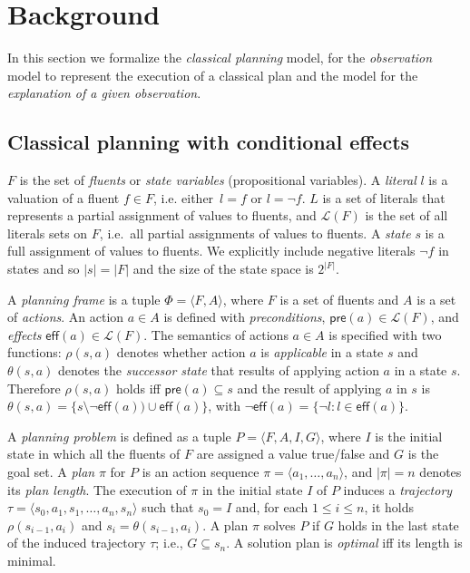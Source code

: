 \documentclass[runningheads]{llncs}
\newcommand{\tup}[1]{{\langle #1 \rangle}}
\newcommand{\pre}{\mathsf{pre}}     %
\newcommand{\eff}{\mathsf{eff}}     %
\begin{document}
\section{Background}

In this section we formalize the {\em classical planning} model, for the {\em observation} model to represent the execution of a classical plan and the model for the \emph{explanation of a given observation}.

\subsection{Classical planning with conditional effects}
$F$ is the set of {\em fluents} or {\em state variables} (propositional variables). A {\em literal} $l$ is a valuation of a fluent $f\in F$, i.e. either~$l=f$ or $l=\neg f$. $L$ is a set of literals that represents a partial assignment of values to fluents, and $\mathcal{L}(F)$ is the set of all literals sets on $F$, i.e.~all partial assignments of values to fluents. A {\em state} $s$ is a full assignment of values to fluents. We explicitly include negative literals $\neg f$ in states and so $|s|=|F|$ and the size of the state space is $2^{|F|}$.

A {\em planning frame} is a tuple $\Phi=\tup{F,A}$, where $F$ is a set of fluents and $A$ is a set of \emph{actions}. An action $a\in A$ is defined with {\em preconditions}, $\pre(a)\in\mathcal{L}(F)$,  and {\em effects} $\eff(a)\in\mathcal{L}(F)$. The semantics of actions $a\in A$ is specified with two functions: $\rho(s,a)$ denotes whether action $a$ is {\em applicable} in a state $s$ and $\theta(s,a)$ denotes the {\em successor state} that results of applying action $a$ in a state $s$. Therefore $\rho(s,a)$ holds iff $\pre(a)\subseteq s$ and the result of applying $a$ in $s$ is $\theta(s,a)=\{s\setminus\neg\eff(a))\cup\eff(a)\}$, with $\neg\eff(a) = \{\neg l : l \in \eff(a)\}$.

A {\em planning problem} is defined as a tuple $P=\tup{F,A,I,G}$, where $I$ is the initial state in which all the fluents of $F$ are assigned a value true/false and $G$ is the goal set. A {\em plan} $\pi$ for $P$ is an action sequence $\pi=\tup{a_1, \ldots, a_n}$, and $|\pi|=n$ denotes its {\em plan length}. The execution of $\pi$ in the initial state $I$ of $P$ induces a {\em trajectory} $\tau=\tup{s_0, a_1, s_1, \ldots, a_n, s_n}$ such that $s_0=I$ and, for each {\small $1\leq i\leq n$}, it holds $\rho(s_{i-1},a_i)$ and $s_i=\theta(s_{i-1},a_i)$. A plan $\pi$ solves $P$ if $G$ holds in the last state of the induced trajectory $\tau$; i.e., $G \subseteq s_n$. A solution plan is {\em optimal} iff its length is minimal.
\end{document}
